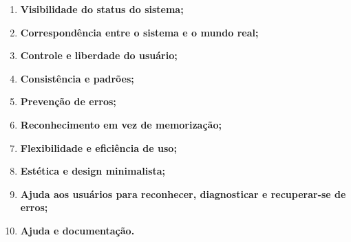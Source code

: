 \documentclass[12pt]{article}
\begin{document}
\begin{abstractp}
\begin{enumerate}
    \item \textbf{Visibilidade do status do sistema;} %
    \item \textbf{Correspondência entre o sistema e o mundo real;} %
    \item \textbf{Controle e liberdade do usuário;} %
    \item \textbf{Consistência e padrões;} %
    \item \textbf{Prevenção de erros;}%
    \item \textbf{Reconhecimento em vez de memorização;} %
    \item \textbf{Flexibilidade e eficiência de uso;} %
    \item \textbf{Estética e design minimalista;} %
    \item \textbf{Ajuda aos usuários para reconhecer, diagnosticar e recuperar-se de erros;} %
    \item \textbf{Ajuda e documentação.} %
\end{enumerate}

\end{abstractp}
\end{document}
